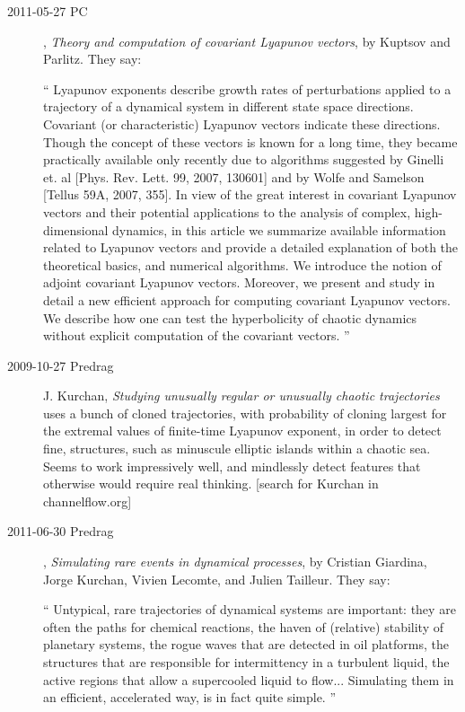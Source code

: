 \begin{description}
\item[2011-05-27 PC] ,
\emph{Theory and computation of covariant Lyapunov vectors},
by Kuptsov and Parlitz. They say:

``
 Lyapunov exponents describe growth
rates of perturbations applied to a trajectory of a dynamical system in
different state space directions. Covariant (or characteristic) Lyapunov
vectors indicate these directions. Though the concept of these vectors is known
for a long time, they became practically available only recently due to
algorithms suggested by Ginelli et. al [Phys. Rev. Lett. 99, 2007, 130601] and
by Wolfe and Samelson [Tellus 59A, 2007, 355]. In view of the great interest in
covariant Lyapunov vectors and their potential applications to the
analysis of complex, high-dimensional dynamics, in this article we summarize
available information related to Lyapunov vectors and provide a detailed
explanation of both the theoretical basics, and numerical algorithms. We
introduce the notion of adjoint covariant Lyapunov vectors. Moreover, we
present and study in detail a new efficient approach for computing covariant
Lyapunov vectors. We describe how one can test the
hyperbolicity of chaotic dynamics without explicit computation of the covariant
vectors.
''

\item[2009-10-27 Predrag]
J. Kurchan, {\em Studying unusually regular or unusually chaotic
trajectories } uses a bunch of cloned trajectories, with probability of
cloning largest for the extremal values of finite-time Lyapunov exponent,
in order to detect fine, structures, such as minuscule elliptic islands
within a chaotic sea. Seems to work impressively well, and mindlessly
detect features that otherwise would require real thinking.
      	[search for Kurchan in channelflow.org]

\item[2011-06-30 Predrag] ,
\emph{Simulating rare events in dynamical processes},
by Cristian Giardina, Jorge Kurchan, Vivien Lecomte,
and Julien Tailleur. They say:

``
Untypical, rare trajectories of dynamical systems are important: they are
often the paths for chemical reactions, the haven of (relative) stability
of planetary systems, the rogue waves that are detected in oil platforms,
the structures that are responsible for intermittency in a turbulent
liquid, the active regions that allow a supercooled liquid to flow...
Simulating them in an efficient, accelerated way, is in fact quite
simple.
''


\end{description}
